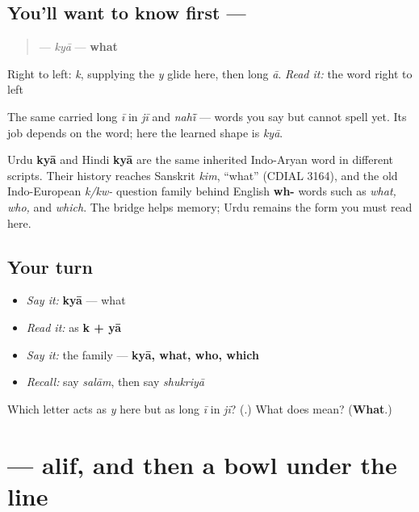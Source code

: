 \subsection*{You'll want to know first — }
\begin{quote}
\textbf{} — \emph{kyā} — \textbf{what}
\end{quote}

Right to left: \textbf{} \emph{k}, \textbf{} supplying the \emph{y} glide here, then \textbf{} long \emph{ā}. \emph{Read it:} the word right to left

The same \textbf{} carried long \emph{ī} in \emph{jī} and \emph{nahī̃} — words you say but cannot spell yet. Its job depends on the word; here the learned shape is \emph{kyā}.

\begin{cousinweb}
Urdu \textbf{kyā} and Hindi \textbf{kyā} are the same inherited Indo-Aryan word in different scripts. Their history reaches Sanskrit \emph{kim}, “what” (CDIAL 3164), and the old Indo-European \emph{k/kw-} question family behind English \textbf{wh-} words such as \emph{what, who,} and \emph{which}. The bridge helps memory; Urdu \textbf{} remains the form you must read here.
\end{cousinweb}

\subsection*{Your turn}
\begin{itemize}
\raggedright
  \item \emph{Say it:} \textbf{kyā} — what
  \item \emph{Read it:} \textbf{} as \textbf{k + yā}
  \item \emph{Say it:} the family — \textbf{kyā, what, who, which}
  \item \emph{Recall:} say \emph{salām}, then say \emph{shukriyā}
\end{itemize}

\begin{tcolorbox}[breakable,colback=teal!4,colframe=teal!35!black,title={Before you move on}]
Which letter acts as \emph{y} here but as long \emph{ī} in \emph{jī}? (\textbf{}.) What does \textbf{} mean? (\textbf{What}.)
\end{tcolorbox}
\section[\texorpdfstring{\ur{ل} (lām)}{ل (lām)}]{ — alif, and then a bowl under the line}

